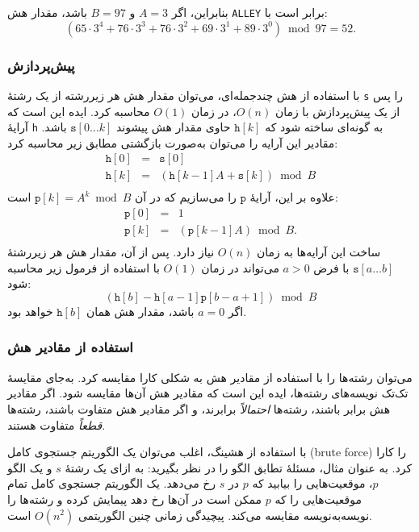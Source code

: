 بنابراین، اگر $A=3$ و $B=97$ باشد، مقدار هش
\texttt{ALLEY} برابر است با:
\[(65 \cdot 3^4 + 76 \cdot 3^3 + 76 \cdot 3^2 + 69 \cdot 3^1 + 89 \cdot 3^0) \bmod 97 = 52.\]

\subsubsection*{پیش‌پردازش}

با استفاده از هش چندجمله‌ای، می‌توان مقدار هش هر زیررشته از یک رشتهٔ \texttt{s} را پس از یک پیش‌پردازش با زمان $O(n)$، در زمان $O(1)$ محاسبه کرد.
ایده این است که آرایهٔ \texttt{h} به گونه‌ای ساخته شود که
$\texttt{h}[k]$ حاوی مقدار هش پیشوند $\texttt{s}[0 \ldots k]$ باشد.
مقادیر این آرایه را می‌توان به‌صورت بازگشتی مطابق زیر محاسبه کرد:
\[
\begin{array}{lcl}
\texttt{h}[0] & = & \texttt{s}[0] \\
\texttt{h}[k] & = & (\texttt{h}[k-1] A + \texttt{s}[k]) \bmod B \\
\end{array}
\]
علاوه بر این، آرایهٔ $\texttt{p}$ را می‌سازیم
که در آن $\texttt{p}[k]=A^k \bmod B$ است:
\[
\begin{array}{lcl}
\texttt{p}[0] & = & 1 \\
\texttt{p}[k] & = & (\texttt{p}[k-1] A) \bmod B. \\
\end{array}
\]
ساخت این آرایه‌ها به زمان $O(n)$ نیاز دارد.
پس از آن، مقدار هش هر زیررشتهٔ
$\texttt{s}[a \ldots b]$
با فرض $a>0$ می‌تواند در زمان $O(1)$ با استفاده از فرمول زیر محاسبه شود:
\[(\texttt{h}[b]-\texttt{h}[a-1] \texttt{p}[b-a+1]) \bmod B\]
اگر $a=0$ باشد، مقدار هش همان $\texttt{h}[b]$ خواهد بود.

\subsubsection*{استفاده از مقادیر هش}

می‌توان رشته‌ها را با استفاده از مقادیر هش به شکلی کارا مقایسه کرد.
به‌جای مقایسهٔ تک‌تک نویسه‌های رشته‌ها،
ایده این است که مقادیر هش آن‌ها مقایسه شود.
اگر مقادیر هش برابر باشند،
رشته‌ها \emph{احتمالاً} برابرند،
و اگر مقادیر هش متفاوت باشند،
رشته‌ها \emph{قطعاً} متفاوت هستند.

با استفاده از هشینگ، اغلب می‌توان یک الگوریتم جستجوی کامل (brute force) را کارا کرد.
به عنوان مثال، مسئلهٔ تطابق الگو را در نظر بگیرید:
به ازای یک رشتهٔ $s$ و یک الگو $p$،
موقعیت‌هایی را بیابید که $p$ در $s$ رخ می‌دهد.
یک الگوریتم جستجوی کامل تمام موقعیت‌هایی را که $p$ ممکن است در آن‌ها رخ دهد پیمایش کرده و رشته‌ها را نویسه‌به‌نویسه مقایسه می‌کند.
پیچیدگی زمانی چنین الگوریتمی $O(n^2)$ است.


